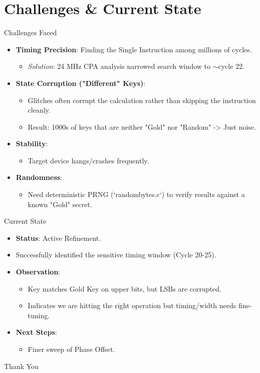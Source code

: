 \documentclass[aspectratio=169]{beamer}
\begin{document}
\section{Challenges \& Current State}
\begin{frame}{Challenges Faced}
    \begin{itemize}
        \item \textbf{Timing Precision}: Finding the Single Instruction among millions of cycles.
            \begin{itemize}
                \item \textit{Solution}: 24 MHz CPA analysis narrowed search window to $\sim$cycle 22.
            \end{itemize}
        \item \textbf{State Corruption ("Different" Keys)}:
            \begin{itemize}
                \item Glitches often corrupt the calculation rather than skipping the instruction cleanly.
                \item Result: 1000s of keys that are neither "Gold" nor "Random" -> Just noise.
            \end{itemize}
        \item \textbf{Stability}:
            \begin{itemize}
                \item Target device hangs/crashes frequently.
            \end{itemize}
        \item \textbf{Randomness}:
            \begin{itemize}
                \item Need deterministic PRNG (`randombytes.c`) to verify results against a known "Gold" secret.
            \end{itemize}
    \end{itemize}
\end{frame}

\begin{frame}{Current State}
    \begin{itemize}
        \item \textbf{Status}: Active Refinement.
        \item Successfully identified the sensitive timing window (Cycle 20-25).
        \item \textbf{Observation}: 
            \begin{itemize}
                \item Key matches Gold Key on upper bits, but LSBs are corrupted.
                \item Indicates we are hitting the right operation but timing/width needs fine-tuning.
            \end{itemize}
        \item \textbf{Next Steps}:
            \begin{itemize}
                \item Finer sweep of Phase Offset.
            \end{itemize}
    \end{itemize}
\end{frame}

\begin{frame}
    \centering
    \Huge Thank You
\end{frame}
\end{document}
